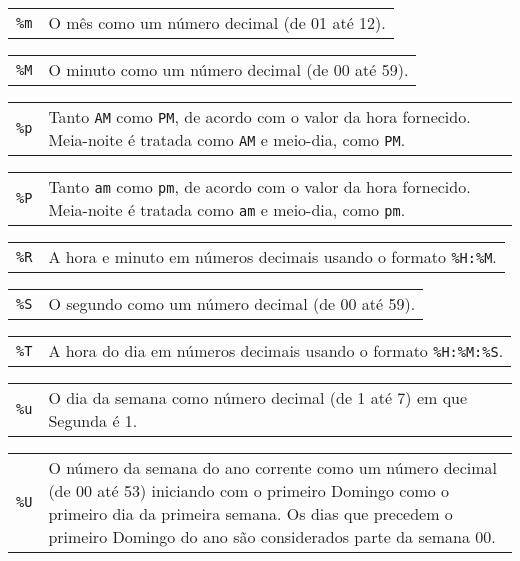 \documentclass[11pt, brazil]{report}
\begin{document}
\begin{tabular}{@{}p{20pt}p{421.5pt}@{}}
{\tt\%m}&O mês como um número decimal (de 01 até 12).\\
\end{tabular}

\begin{tabular}{@{}p{20pt}p{421.5pt}@{}}
{\tt\%M}&O minuto como um número decimal (de 00 até 59).\\
\end{tabular}

\begin{tabular}{@{}p{20pt}p{421.5pt}@{}}
{\tt\%p}&Tanto {\tt AM} como {\tt PM}, de acordo com o valor da hora fornecido.
Meia-noite é tratada como {\tt AM} e meio-dia, como {\tt PM}.\\
\end{tabular}

\begin{tabular}{@{}p{20pt}p{421.5pt}@{}}
{\tt\%P}&Tanto {\tt am} como {\tt pm}, de acordo com o valor da hora fornecido.
Meia-noite é tratada como {\tt am} e meio-dia, como {\tt pm}.\\
\end{tabular}

\begin{tabular}{@{}p{20pt}p{421.5pt}@{}}
{\tt\%R}&A hora e minuto em números decimais usando o formato
\verb|%H:%M|.\\
\end{tabular}

\begin{tabular}{@{}p{20pt}p{421.5pt}@{}}
{\tt\%S}&O segundo como um número decimal (de 00 até 59).\\
\end{tabular}

\begin{tabular}{@{}p{20pt}p{421.5pt}@{}}
{\tt\%T}&A hora do dia em números decimais usando o formato
\verb|%H:%M:%S|.\\
\end{tabular}

\begin{tabular}{@{}p{20pt}p{421.5pt}@{}}
{\tt\%u}&O dia da semana como número decimal (de 1 até 7) em que Segunda
é 1.\\
\end{tabular}

\begin{tabular}{@{}p{20pt}p{421.5pt}@{}}
{\tt\%U}&O número da semana do ano corrente como um número decimal (de
00 até 53) iniciando com o primeiro Domingo como o primeiro dia da
primeira semana. Os dias que precedem o primeiro Domingo do ano são
considerados parte da semana 00.
\end{tabular}
\end{document}
